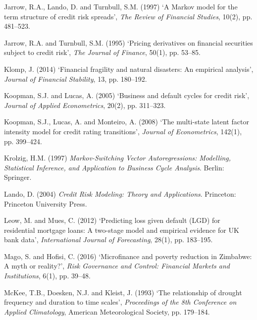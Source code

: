 \documentclass[12pt,a4paper]{article}
\begin{document}
\begin{description}[style=nextline, leftmargin=0pt, labelwidth=0pt, itemsep=0.5em]
\item Jarrow, R.A., Lando, D. and Turnbull, S.M. (1997) `A Markov model for the term structure of credit risk spreads', \textit{The Review of Financial Studies}, 10(2), pp. 481--523.

\item Jarrow, R.A. and Turnbull, S.M. (1995) `Pricing derivatives on financial securities subject to credit risk', \textit{The Journal of Finance}, 50(1), pp. 53--85.

\item Klomp, J. (2014) `Financial fragility and natural disasters: An empirical analysis', \textit{Journal of Financial Stability}, 13, pp. 180--192.

\item Koopman, S.J. and Lucas, A. (2005) `Business and default cycles for credit risk', \textit{Journal of Applied Econometrics}, 20(2), pp. 311--323.

\item Koopman, S.J., Lucas, A. and Monteiro, A. (2008) `The multi-state latent factor intensity model for credit rating transitions', \textit{Journal of Econometrics}, 142(1), pp. 399--424.

\item Krolzig, H.M. (1997) \textit{Markov-Switching Vector Autoregressions: Modelling, Statistical Inference, and Application to Business Cycle Analysis}. Berlin: Springer.

\item Lando, D. (2004) \textit{Credit Risk Modeling: Theory and Applications}. Princeton: Princeton University Press.

\item Leow, M. and Mues, C. (2012) `Predicting loss given default (LGD) for residential mortgage loans: A two-stage model and empirical evidence for UK bank data', \textit{International Journal of Forecasting}, 28(1), pp. 183--195.

\item Mago, S. and Hofisi, C. (2016) `Microfinance and poverty reduction in Zimbabwe: A myth or reality?', \textit{Risk Governance and Control: Financial Markets and Institutions}, 6(1), pp. 39--48.

\item McKee, T.B., Doesken, N.J. and Kleist, J. (1993) `The relationship of drought frequency and duration to time scales', \textit{Proceedings of the 8th Conference on Applied Climatology}, American Meteorological Society, pp. 179--184.


\end{description}
\end{document}
